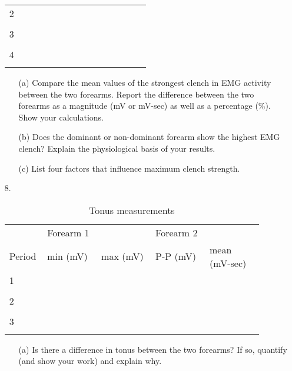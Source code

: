 \documentclass{article}
\begin{document}
\begin{itemize}
\begin{table}[h!]
\begin{tabular}[h!]{p{0.1\linewidth}|p{0.2\linewidth}p{0.2\linewidth}p{0.2\linewidth}p{0.2\linewidth}}
	\midrule
	2 & & & &\\& & & &\\
	\midrule
	3 & & & &\\& & & &\\
	\midrule
	4 & & & &\\& & & &\\
	\bottomrule
	\end{tabular}
	\end{table}
	
	\begin{itemize}
		\item[(a)] Compare the mean values of the strongest clench in EMG activity between the two forearms. Report the difference between the two forearms as a magnitude (mV or mV-sec) as well as a percentage (\%). Show your calculations.\vspace{6cm}
		\item[(b)] Does the dominant or non-dominant forearm show the highest EMG clench? Explain the physiological basis of your results.\vspace{5cm}
		\item[(c)] List four factors that influence maximum clench strength.\vspace{4cm}
	\end{itemize}
	
	\item[8.]
	\begin{table}[h!]
	\centering
	\caption{Tonus measurements}
	\begin{tabular}[h!]{p{0.1\linewidth}|p{0.2\linewidth}p{0.2\linewidth}|p{0.2\linewidth}p{0.2\linewidth}}
	\toprule
	& Forearm 1 & & Forearm 2 &\\
	Period & min (mV) & max (mV) & P-P (mV) & mean (mV-sec)\\
	\midrule
	1 & & & &\\& & & &\\
	
	\midrule
	2 & & & &\\& & & &\\
	\midrule
	3 & & & &\\& & & &\\
	\bottomrule
	\end{tabular}
	\end{table}
	
	\begin{itemize}
		\item[(a)] Is there a difference in tonus between the two forearms? If so, quantify (and show your work) and explain why.\vspace{6cm}
	\end{itemize}
\end{itemize}
\end{document}
